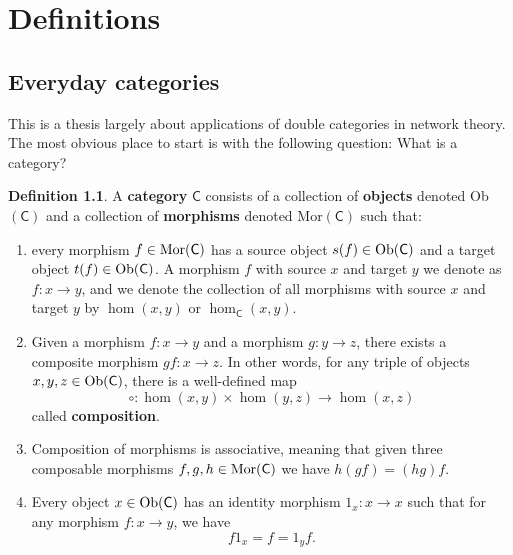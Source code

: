 \documentclass[oneside,final]{ucr}
\theoremstyle{definition}
\newtheorem{definition}[theorem]{Definition}
\newcommand{\define}[1]{{\bf \boldmath #1}}
\begin{document}
{\ssp
\appendix 
\chapter{Definitions}\label{Appendix}

\section{Everyday categories}\label{AppendixA}
This is a thesis largely about applications of double categories in network theory. The most obvious place to start is with the following question: What is a category?

\begin{definition}
A \define{category} $\mathsf{C}$ consists of a collection of \define{objects} denoted Ob$(\mathsf{C})$ and a collection of \define{morphisms} denoted Mor$(\mathsf{C})$ such that: 
\begin{enumerate}
\item{every morphism $f \in \textnormal{Mor}(\mathsf{C})$ has a source object $s(f) \in \textnormal{Ob}(\mathsf{C})$ and a target object $t(f) \in \textnormal{Ob}(\mathsf{C})$. A morphism $f$ with source $x$ and target $y$ we denote as $f \colon x \to y$, and we denote the collection of all morphisms with source $x$ and target $y$ by $\hom(x,y)$ or $\hom_\mathsf{C}(x,y)$.}
\item{Given a morphism $f \colon x \to y$ and a morphism $g \colon y \to z$, there exists a composite morphism $gf \colon x \to z$. In other words, for any triple of objects $x,y,z \in \textnormal{Ob}(\mathsf{C})$, there is a well-defined map
\[
\circ \colon \hom(x,y) \times \hom(y,z) \to \hom(x,z)
\]
called \define{composition}.}
\item{Composition of morphisms is associative, meaning that given three composable morphisms $f,g,h \in \textnormal{Mor}(\mathsf{C})$ we have $h(gf)=(hg)f$.}
\item{Every object $x \in \textnormal{Ob}(\mathsf{C})$ has an identity morphism $1_x \colon x \to x$ such that for any morphism $f \colon x \to y$, we have
\[
f 1_x = f = 1_y f.
\]}
\end{enumerate}
\end{definition}

}
\end{document}
